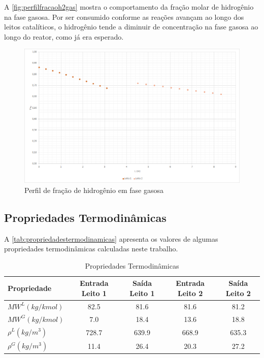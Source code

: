 A \autoref{fig:perfilfracaoh2gas} mostra o comportamento da
fração molar de hidrogênio na fase gasosa. Por ser consumido conforme as reações
avançam ao longo dos leitos catalíticos, o hidrogênio tende a diminuir de
concentração na fase gasosa ao longo do reator, como já era esperado.

\begin{figure}[htb]
\centering
\includegraphics[scale=0.4]{images/Chap4/perfilfracaoh2gas.png}
\caption{Perfil de fração de hidrogênio em fase gasosa}
\label{fig:perfilfracaoh2gas}
\end{figure}

\subsection{Propriedades Termodinâmicas} \label{propriedadestermodinâmicas}

A \autoref{tab:propriedadestermodinamicas} apresenta os valores de algumas
propriedades termodinâmicas calculadas neste trabalho.

\begin{table}[!htb]
\begin{center}
\caption{Propriedades Termodinâmicas}
\label{tab:propriedadestermodinamicas}
\small
\begin{tabular}{lcccc}
{Propriedade} & {Entrada Leito 1} & {Saída Leito 1} & {Entrada Leito 2} &
{Saída Leito 2}
\\
\hline
{${MW^{L} (kg/kmol)}$} & 82.5 & 81.6 & 81.6 & 81.2 \\
{${MW^{G} (kg/kmol)}$} & 7.0 & 18.4 & 13.6 & 18.8 \\
{$\rho^{L}(kg/m^{3})$} & 728.7 & 639.9 & 668.9 & 635.3 \\
{$\rho^{G}(kg/m^{3})$} & 11.4 & 26.4 & 20.3 & 27.2 \\
\bottomrule
\end{tabular}
\end{center}
\end{table}

